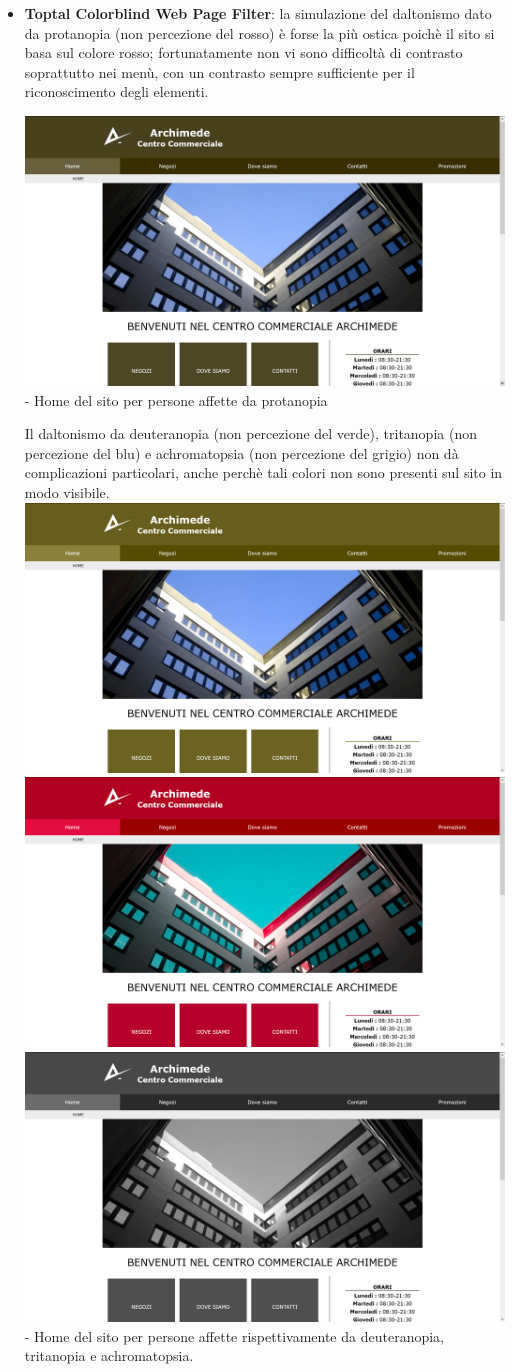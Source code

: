 \documentclass[a4paper,12pt]{article}
\begin{document}
\begin{itemize}
	\item \textbf{Toptal Colorblind Web Page Filter}: la simulazione del daltonismo dato da protanopia (non percezione del rosso) è forse la più ostica poichè il sito si basa sul colore rosso; fortunatamente non vi sono difficoltà di contrasto soprattutto nei menù, con un contrasto sempre sufficiente per il riconoscimento degli elementi.\\
	\vskip1cm
	\begin{center}
		\includegraphics[width=0.7\linewidth]{images/protanopia}\\- Home del sito per persone affette da protanopia
	\end{center}
	\vskip1cm
	Il daltonismo da deuteranopia (non percezione del verde), tritanopia (non percezione del blu) e achromatopsia (non percezione del grigio) non dà complicazioni particolari, anche perchè tali colori non sono presenti sul sito in modo visibile.
	\vskip1cm
	\includegraphics[width=0.3\linewidth]{images/deuteranopia}
	\includegraphics[width=0.3\linewidth]{images/tritanopia}
	\includegraphics[width=0.3\linewidth]{images/achromatopsia}\\- Home del sito per persone affette rispettivamente da deuteranopia, tritanopia e achromatopsia.
	\end{itemize}
\end{document}
